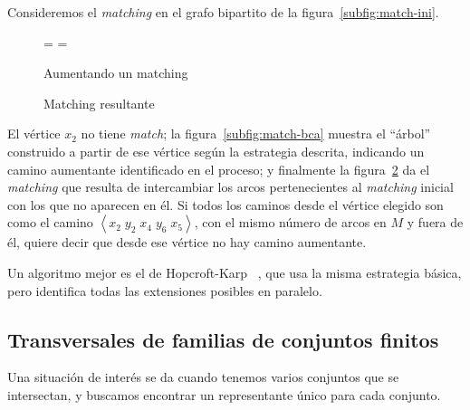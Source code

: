   Consideremos el \emph{\foreignlanguage{english}{matching}}
  en el grafo bipartito
  de la figura~\ref{subfig:match-ini}.
  \begin{figure}[htbp]
    =\hbox{}
    =\hbox{}
    \centering
    \hspace{3em}%
    \caption{Aumentando un matching}
    \label{fig:matching-1}
  \end{figure}
  \begin{figure}[htbp]
    \centering
    \caption{Matching resultante}
    \label{fig:match-fin}
  \end{figure}
  El vértice \(x_2\)
  no tiene \emph{\foreignlanguage{english}{match}};
  la figura~\ref{subfig:match-bca} muestra el ``árbol''
  construido a partir de ese vértice según la estrategia descrita,
  indicando un camino aumentante identificado en el proceso;
  y finalmente la figura~\ref{fig:match-fin}
  da el \emph{\foreignlanguage{english}{matching}}
  que resulta de intercambiar los arcos
  pertenecientes
  al \emph{\foreignlanguage{english}{matching}} inicial
  con los que no aparecen en él.
  Si todos los caminos desde el vértice elegido
  son como el camino
    \(\left\langle x_2\;y_2\;x_4\;y_6\;x_5 \right\rangle\),
  con el mismo número de arcos en \(M\) y fuera de él,
  quiere decir que desde ese vértice no hay camino aumentante.

  Un algoritmo mejor es el de Hopcroft-Karp~%
    \cite{hopcroft73:_alg_max_match_bipar_graph},%
  que usa la misma estrategia básica,
  pero identifica todas las extensiones posibles en paralelo.

\subsection{Transversales de familias de conjuntos finitos}
\label{sec:transversals}

  Una situación de interés se da
  cuando tenemos varios conjuntos que se intersectan,
  y buscamos encontrar un representante único
  para cada conjunto.

